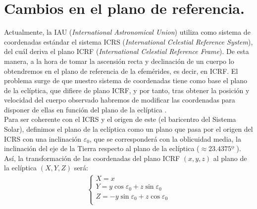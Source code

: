 \section{Cambios en el plano de referencia.}
\label{sec:reference_plane}
Actualmente, la IAU (\textit{International Astronomical Union}) utiliza como sistema de coordenadas estándar el sistema ICRS (\textit{International Celestial Reference System}), del cuál deriva el plano ICRF (\textit{International Celestial Reference Frame}). De esta manera, a la hora de tomar la ascensión recta y declinación de un cuerpo lo obtendremos en el plano de referencia de la efemérides, es decir, en ICRF. El problema surge de que nuestro sistema de coordenadas tiene como base el plano de la eclíptica, que difiere de plano ICRF, y por tanto, tras obtener la posición y velocidad del cuerpo observado habremos de modificar las coordenadas para disponer de ellas en función del plano de la eclíptica \cite{ICRF}.\\

Para ser coherente con el ICRS y el origen de este (el baricentro del Sistema Solar), definimos el plano de la eclíptica como un plano que pasa por el origen del ICRS con una inclinación $\varepsilon_0$, que se corresponderá con la oblicuidad media, la inclinación del eje de la Tierra respecto al plano de la eclíptica \cite{ICRF} ($\approx23.4375º$ \cite{jpl}). Así, la transformación de las coordenadas del plano ICRF $(x,y,z)$ al plano de la eclíptica $(X,Y,Z)$ será:
\begin{align}
\left\{
\begin{array}{l}
	X=x\\
	Y=y\cos{\varepsilon_0}+z\sin{\varepsilon_0}\\
	Z=-y\sin{\varepsilon_0}+z\cos{\varepsilon_0}\\
\end{array}
\right.
\label{eq:ICRS_to_ecliptic}
\end{align}




\newpage
\thispagestyle{empty}


